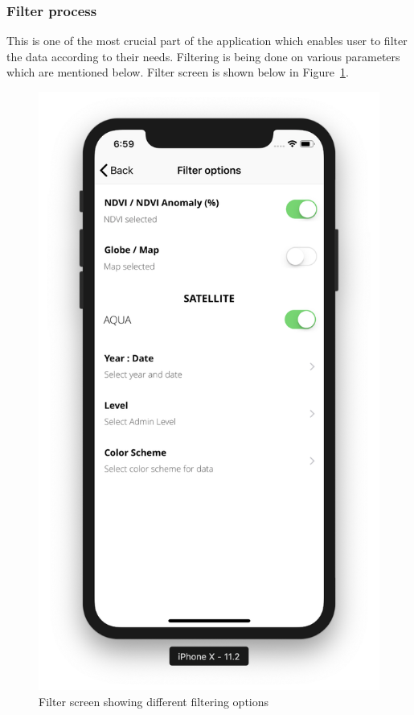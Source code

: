 \subsubsection{Filter process}

This is one of the most crucial part of the application which enables user to filter the data according to their needs. Filtering is being done on various parameters which are mentioned below. Filter screen is shown below in Figure~\ref{fig:filter_datatype}.

    \begin{figure}[H]
            \centering
            \includegraphics[width=0.25\linewidth]{figures/ch4/filter.png}
            \caption{\label{fig:filter_datatype} Filter screen showing different filtering options}
    \end{figure}


